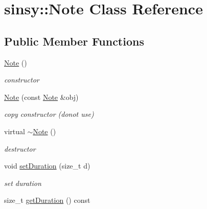 \hypertarget{classsinsy_1_1Note}{\section{sinsy\-:\-:\-Note \-Class \-Reference}
\label{classsinsy_1_1Note}
}
\subsection*{\-Public \-Member \-Functions}
\begin{DoxyCompactItemize}
\item 
\hypertarget{classsinsy_1_1Note_a11dfaf68eb7a094b121add4adb18620e}{\hyperlink{classsinsy_1_1Note_a11dfaf68eb7a094b121add4adb18620e}{\-Note} ()}\label{classsinsy_1_1Note_a11dfaf68eb7a094b121add4adb18620e}

\begin{DoxyCompactList}\small\item\em constructor \end{DoxyCompactList}\item 
\hyperlink{classsinsy_1_1Note_a2bb5143ddd22a39471ecde82ad36ba1a}{\-Note} (const \hyperlink{classsinsy_1_1Note}{\-Note} \&obj)
\begin{DoxyCompactList}\small\item\em copy constructor (donot use) \end{DoxyCompactList}\item 
\hypertarget{classsinsy_1_1Note_ade484273015c82e7fa59a028de0d8818}{virtual \hyperlink{classsinsy_1_1Note_ade484273015c82e7fa59a028de0d8818}{$\sim$\-Note} ()}\label{classsinsy_1_1Note_ade484273015c82e7fa59a028de0d8818}

\begin{DoxyCompactList}\small\item\em destructor \end{DoxyCompactList}\item 
\hypertarget{classsinsy_1_1Note_a43a0afbf8b08c9914e04c60df216643a}{void \hyperlink{classsinsy_1_1Note_a43a0afbf8b08c9914e04c60df216643a}{set\-Duration} (size\-\_\-t d)}\label{classsinsy_1_1Note_a43a0afbf8b08c9914e04c60df216643a}

\begin{DoxyCompactList}\small\item\em set duration \end{DoxyCompactList}\item 
\hypertarget{classsinsy_1_1Note_a2e168a9f8a7fa4ef4f49ffd457fd9db8}{size\-\_\-t \hyperlink{classsinsy_1_1Note_a2e168a9f8a7fa4ef4f49ffd457fd9db8}{get\-Duration} () const }\label{classsinsy_1_1Note_a2e168a9f8a7fa4ef4f49ffd457fd9db8}


\end{DoxyCompactItemize}
